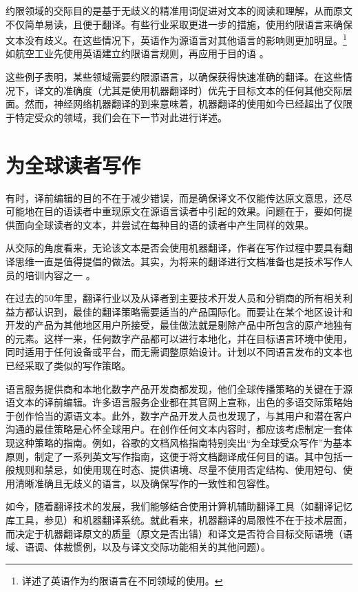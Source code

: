 \documentclass[output=paper,colorlinks,citecolor=brown]{langscibook}
\begin{document}
约限领域的交际目的是基于无歧义的精准用词促进对文本的阅读和理解，从而原文不仅简单易读，且便于翻译。有些行业采取更进一步的措施，使用约限语言来确保文本没有歧义。在这些情况下，英语作为源语言对其他语言的影响则更加明显。\footnote{\citet{SeoaneVicente2015} 详述了英语作为约限语言在不同领域的使用。} 如航空工业先使用英语建立约限语言规则，再应用于目的语 \citep{Ghiara2018}。

这些例子表明，某些领域需要约限源语言，以确保获得快速准确的翻译。在这些情况下，译文的准确度（尤其是使用机器翻译时）优先于目标文本的任何其他交际层面。然而，神经网络机器翻译的到来意味着，机器翻译的使用如今已经超出了仅限于特定受众的领域，我们会在下一节对此进行详述。


\section{为全球读者写作}

有时，译前编辑的目的不在于减少错误，而是确保译文不仅能传达原文意思，还尽可能地在目的语读者中重现原文在源语言读者中引起的效果。问题在于，要如何提供面向全球读者的文本，并尝试在每种目的语的读者中产生同样的效果。

从交际的角度看来，无论该文本是否会使用机器翻译，作者在写作过程中要具有翻译思维一直是值得提倡的做法。其实，为将来的翻译进行文档准备也是技术写作人员的培训内容之一 \citep{Maylath1997}。

\hspace*{-1mm}在过去的50年里，翻译行业以及从译者到主要技术开发人员和分销商的所有相关利益方都认识到，最佳的翻译策略需要适当的产品国际化\citep[14]{Fry2003}。而要让在某个地区设计和开发的产品为其他地区用户所接受，最佳做法就是剔除产品中所包含的原产地独有的元素。这样一来，任何数字产品都可以进行本地化，并在目标语言环境中使用，同时适用于任何设备或平台，而无需调整原始设计。计划以不同语言发布的文本也已经采取了类似的写作策略。

语言服务提供商和本地化数字产品开发商都发现，他们全球传播策略的关键在于源语文本的译前编辑。许多语言服务企业都在其官网上宣称，出色的多语交际策略始于创作恰当的源语文本。此外，数字产品开发人员也发现了，与其用户和潜在客户沟通的最佳策略是心怀全球用户。在创作任何文本内容时，都应该考虑制定一套体现这种策略的指南。例如，谷歌的文档风格指南特别突出“为全球受众写作”为基本原则，制定了一系列英文写作指南，这便于将文档翻译成任何目的语。其中包括一般规则和禁忌，如使用现在时态、提供语境、尽量不使用否定结构、使用短句、使用清晰准确且无歧义的语言，以及确保写作的一致性和包容性\citep{Google2020}。

如今，随着翻译技术的发展，我们能够结合使用计算机辅助翻译工具（如翻译记忆库工具，参见）和机器翻译系统。就此看来，机器翻译的局限性不在于技术层面，而决定于机器翻译原文的质量（原文是否出错）和译文是否符合目标交际语境（语域、语调、体裁惯例，以及与译文交际功能相关的其他问题）。
\end{document}
